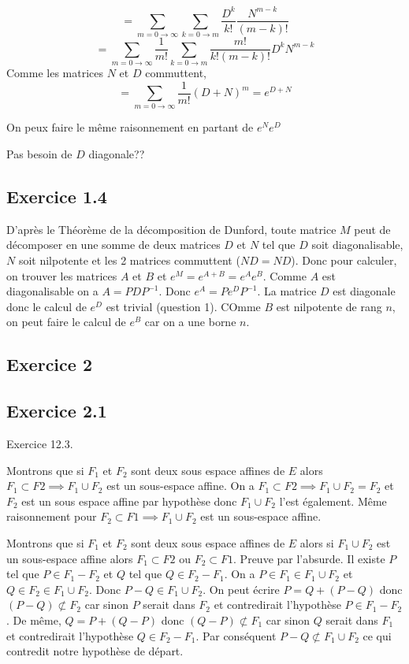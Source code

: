 \documentclass[]{book}
\theoremstyle{definition}
\begin{document}
$$
= \sum_{m = 0 \to \infty}\sum_{k = 0 \to m}{\frac{D^k}{k!}\frac{N^{m-k}}{(m-k)!}}
$$
$$
= \sum_{m = 0 \to \infty}\frac{1}{m!}\sum_{k = 0 \to m}{\frac{m!}{k!(m-k)!}D^kN^{m-k}}
$$
Comme les matrices $N$ et $D$ commuttent,
$$
= \sum_{m = 0 \to \infty}{\frac{1}{m!}(D+N)^m} = e^{D+N}
$$

On peux faire le m\^eme raisonnement en partant de $e^Ne^D$

Pas besoin de $D$ diagonale??

\subsection*{Exercice 1.4}
D'apr\`es le Th\'eor\`eme de la d\'ecomposition de Dunford, toute matrice $M$ peut de d\'ecomposer en une somme de deux matrices $D$ et $N$ tel que $D$ soit diagonalisable, $N$ soit nilpotente et les 2 matrices commuttent ($ND = ND$).
Donc pour calculer, on trouver les matrices $A$ et $B$ et $e^M= e^{A+B} = e^Ae^B$. Comme $A$ est diagonalisable on a $A=PDP^{-1}$. Donc $e^A = Pe^DP^{-1}$. La matrice $D$ est diagonale donc le calcul de $e^D$ est trivial (question 1). COmme $B$ est nilpotente de rang $n$, on peut faire le calcul de $e^B$ car on a une borne $n$.

\subsection*{Exercice 2}
\subsection*{Exercice 2.1}
Exercice 12.3.

Montrons que si $F_1$ et $F_2$ sont deux sous espace affines de $E$ alors $F_1 \subset F2 \implies F_1 \cup F_2$ est un sous-espace affine. On a $F_1 \subset F2 \implies F_1 \cup F_2 = F_2$ et $F_2$ est un sous espace affine par hypoth\`ese donc $F_1 \cup F_2$ l'est \'egalement. M\^eme raisonnement pour $F_2 \subset F1 \implies F_1 \cup F_2$ est un sous-espace affine.

Montrons que si $F_1$ et $F_2$ sont deux sous espace affines de $E$ alors si $F_1 \cup F_2$ est un sous-espace affine alors $F_1 \subset F2$ ou $F_2 \subset F1$. Preuve par l'absurde. Il existe $P$ tel que $P \in F_1 - F_2$ et $Q$ tel que $Q \in F_2 - F_1$. On a $P \in F_1 \in F_1 \cup F_2$ et $Q \in F_2 \in F_1 \cup F_2$. Donc $P-Q \in F_1 \cup F_2$.
On peut \'ecrire $P = Q + (P-Q)$ donc $(P-Q) \not \subset F_2$ car sinon $P$ serait dans $F_2$ et contredirait l'hypoth\`ese $P \in F_1 - F_2$. De m\^eme, $Q = P + (Q-P)$ donc $(Q-P) \not \subset F_1$ car sinon $Q$ serait dans $F_1$ et contredirait l'hypoth\`ese $Q \in F_2 - F_1$. Par cons\'equent $P-Q \not \subset F_1 \cup F_2$ ce qui contredit notre hypoth\`ese de d\'epart.
\end{document}
